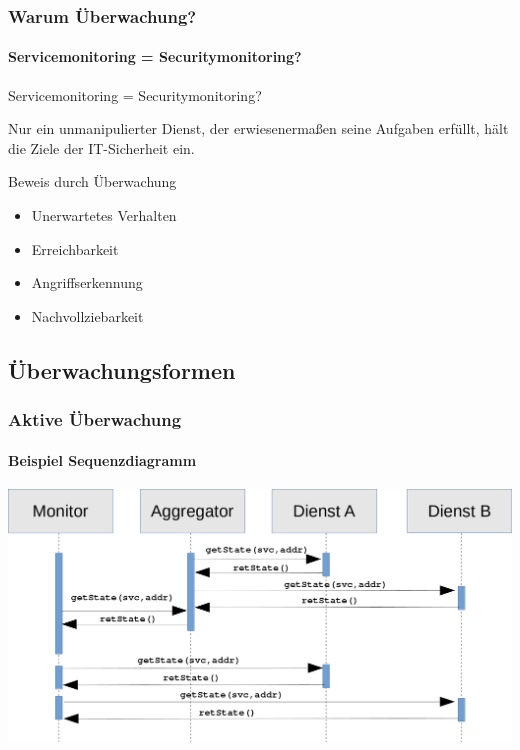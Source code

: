 \documentclass[10pt]{beamer} %
\begin{document}
\begin{frame}
    \frametitle{Warum Überwachung?}
        \framesubtitle{Servicemonitoring = Securitymonitoring?}
        
        \begin{alertblock}{\centering Servicemonitoring = Securitymonitoring?}
            \vspace{0.3cm}
            \vspace{0.3cm}
            
            Nur ein unmanipulierter Dienst, der erwiesenermaßen seine
            Aufgaben erfüllt, hält die Ziele der IT-Sicherheit ein.\\
            \vspace{0.3cm}
        \end{alertblock}     
    
        \pause
           
        \begin{alertblock}{Beweis durch Überwachung}
             \begin{itemize}
                 \item Unerwartetes Verhalten
                 \item Erreichbarkeit
                 \item Angriffserkennung
                 \item Nachvollziebarkeit
             \end{itemize}
        \end{alertblock}
    

\end{frame}

\subsection{Überwachungsformen}
\begin{frame}
    \frametitle{Aktive Überwachung}
        \framesubtitle{Beispiel Sequenzdiagramm}
        
        \includegraphics[scale=0.25]{img/sequence_uml_active_trans.png}

\end{frame}
\end{document}
